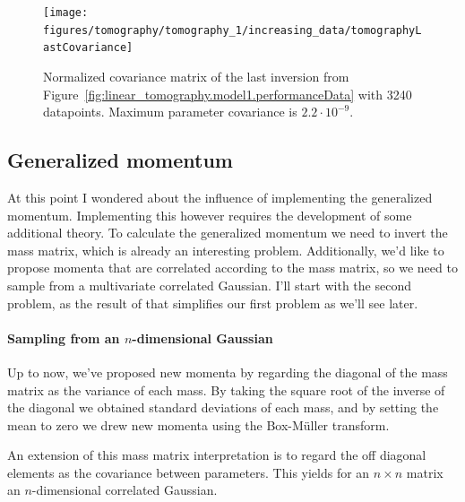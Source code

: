 \begin{figure}
	\centering
	
	\texttt{[image: figures/tomography/tomography\_1/increasing\_data/tomographyLastCovariance]}
	
	\caption{Normalized covariance matrix of the last inversion from Figure~\ref{fig:linear_tomography.model1.performanceData} with 3240 datapoints. Maximum parameter covariance is $2.2 \cdot 10^{-9}$.}
	\label{fig:linear_tomography.model1.performanceLastCovariance}
\end{figure}
%	
%	



\subsection{Generalized momentum}
At this point I wondered about the influence of implementing the generalized momentum. Implementing this however requires the development of some additional theory. To calculate the generalized momentum we need to invert the mass matrix, which is already an interesting problem. Additionally, we'd like to propose momenta that are correlated according to the mass matrix, so we need to sample from a multivariate correlated Gaussian. I'll start with the second problem, as the result of that simplifies our first problem as we'll see later.

\paragraph{Sampling from an $n$-dimensional Gaussian}
Up to now, we've proposed new momenta by regarding the diagonal of the mass matrix as the variance of each mass. By taking the square root of the inverse of the diagonal we obtained standard deviations of each mass, and by setting the mean to zero we drew new momenta using the Box-M\"uller transform.

An extension of this mass matrix interpretation is to regard the off diagonal elements as the covariance between parameters. This yields for an $n \times n$ matrix an $n$-dimensional correlated Gaussian. 

